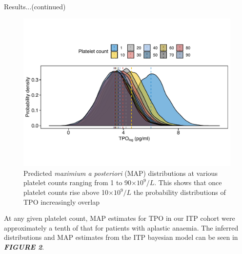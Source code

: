\documentclass[landscape,a0paper,fontscale=0.285]{beamer} %
\newlength{\onecolwid}
\newlength{\twocolwid}
\begin{document}
\begin{frame}[t]
\begin{columns}[t]
\begin{column}{\twocolwid}
\begin{columns}[t,totalwidth=\twocolwid]
\begin{column}{\onecolwid}
\begin{block}{Results...(continued)}
\begin{figure}[H]
\includegraphics[width=0.8\linewidth]{fig/Probability_density.pdf}
\caption{Predicted \textit{maximium a posteriori} (MAP) distributions at various platelet counts ranging from 1 to 90$\times 10^9/L$. This shows that once platelet counts rise above 10$\times 10^9/L$ the probability distributions of TPO increasingly overlap}
\end{figure}

At any given platelet count, MAP estimates for TPO in our ITP cohort were approximately a tenth of that for patients with aplastic anaemia. The inferred distributions and MAP estimates from the ITP bayesian model can be seen in \textbf{\emph{FIGURE 2}}.









\end{block}
\end{column}
\end{columns}
\end{column}
\end{columns}
\end{frame}
\end{document}
